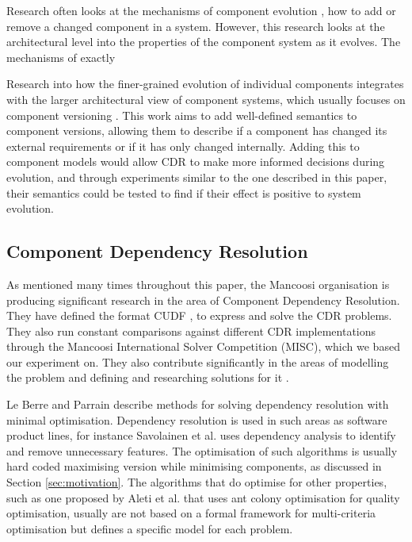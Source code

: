 Research often looks at the mechanisms of component evolution \citep{Wang2006}, how to add or remove a changed component in a system.  
However, this research looks at the architectural level into the properties of the component system as it evolves.
The mechanisms of exactly 

Research into how the finer-grained evolution of individual components integrates with the larger architectural view of component systems, which
usually focuses on component versioning \citep{Bauml2009,Stuckenholz2005}.
This work aims to add well-defined semantics to component versions, 
allowing them to describe if a component has changed its external requirements or if it has only changed internally.
Adding this to component models would allow CDR to make more informed decisions during evolution, 
and through experiments similar to the one described in this paper,
their semantics could be tested to find if their effect is positive to system evolution.

\subsection{Component Dependency Resolution}

As mentioned many times throughout this paper, 
the Mancoosi organisation is producing significant research in the area of Component Dependency Resolution.
They have defined the format CUDF \citep{treinen2009common}, to express and solve the CDR problems.
They also run constant comparisons against different CDR implementations through the Mancoosi International Solver Competition (MISC),
which we based our experiment on.
They also contribute significantly in the areas of modelling the problem \citep{Cosmo2010} 
and defining and researching solutions for it \citep{Trezentos2010}.

Le Berre and Parrain \citep{Berre2008} describe methods for solving dependency resolution with minimal optimisation.
Dependency resolution is used in such areas as software product lines,
for instance Savolainen et al. \citep{savolainen_analyzing_2007} uses dependency analysis to identify and remove unnecessary features.
The optimisation of such algorithms is usually hard coded maximising version while minimising components, 
as discussed in Section \ref{sec:motivation}.
The algorithms that do optimise for other properties, 
such as one proposed by Aleti et al. \citep{Aleti2009} that uses ant colony optimisation for quality optimisation,
usually are not based on a formal framework for multi-criteria optimisation but defines a specific model for each problem.

